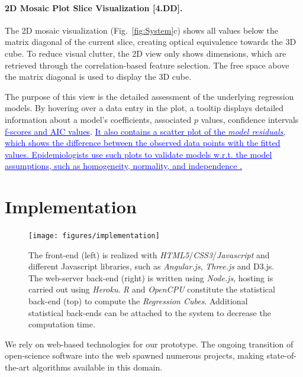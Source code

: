 \documentclass[journal]{style/vgtc} 			          %
\newcommand{\add}[1]{\textcolor{blue}{\uline{#1}}}
\begin{document}
\paragraph{2D Mosaic Plot Slice Visualization [4.DD].}
The 2D mosaic visualization (Fig.~\ref{fig:System}c) shows all values below the matrix diagonal of the current slice, creating optical equivalence towards the 3D cube.
To reduce visual clutter, the 2D view only shows dimensions, which are retrieved through the correlation-based feature selection.
The free space above the matrix diagonal is used to display the 3D cube.

The purpose of this view is the detailed assessment of the underlying regression models.
By hovering over a data entry in the plot, a tooltip displays detailed information about a model's coefficients, associated $p$ values, confidence intervals \add{f-scores and AIC values}.
\add{
It also contains a scatter plot of the \emph{model residuals}, which shows the difference between the observed data points with the fitted values.
Epidemiologists use such plots to validate models w.r.t. the model assumptions, such as homogeneity, normality, and independence \cite{GraphicModelAssessment}.
}

\section{Implementation} \label{implementation}
\begin{figure}[htb]
 \centering
 \texttt{[image: figures/implementation]}
 \caption{
 The front-end (left) is realized with \emph{HTML5}/\emph{CSS3}/\emph{Javascript} and different Javascript libraries, such as \emph{Angular.js}, \emph{Three.js} and D3.js.
 The web-server back-end (right) is written using \emph{Node.js}, hosting is carried out using \emph{Heroku}.
 \emph{R} and \emph{OpenCPU} constitute the statistical back-end (top) to compute the \emph{Regression Cubes}.
 Additional statistical back-ends can be attached to the system to decrease the computation time.
 }
  \label{fig:Implementation}
\end{figure}
We rely on web-based technologies for our prototype.
The ongoing transition of open-science software into the web spawned numerous projects, making state-of-the-art algorithms available in this domain.
\end{document}
